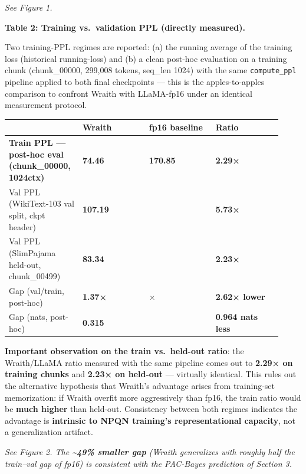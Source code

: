 \emph{See Figure 1.}

\textbf{Table 2: Training vs.~validation PPL (directly measured).}

Two training-PPL regimes are reported: (a) the running average of the
training loss (historical running-loss) and (b) a clean post-hoc
evaluation on a training chunk (chunk\_00000, 299,008 tokens, seq\_len
1024) with the same \texttt{compute\_ppl} pipeline applied to both final
checkpoints --- this is the apples-to-apples comparison to confront
Wraith with LLaMA-fp16 under an identical measurement protocol.

{\def\LTcaptype{none} %
{\footnotesize\setlength{\tabcolsep}{3pt}
\begin{longtable}[]{@{}>{\raggedright\arraybackslash}p{0.230\linewidth}>{\raggedright\arraybackslash}p{0.230\linewidth}>{\raggedright\arraybackslash}p{0.230\linewidth}>{\raggedright\arraybackslash}p{0.230\linewidth}@{}}
\toprule\noalign{}
 & Wraith & fp16 baseline & Ratio \\
\midrule\noalign{}
\endhead
\bottomrule\noalign{}
\endlastfoot
\textbf{Train PPL --- post-hoc eval (chunk\_00000, 1024ctx)} &
\textbf{74.46} & \textbf{170.85} & \textbf{2.29×} \\
Val PPL (WikiText-103 val split, ckpt header) & \textbf{107.19} & 613.96
& \textbf{5.73×} \\
Val PPL (SlimPajama held-out, chunk\_00499) & \textbf{83.34} & 185.84 &
\textbf{2.23×} \\
Gap (val/train, post-hoc) & \textbf{1.37×} & 3.59× & \textbf{2.62×
lower} \\
Gap (nats, post-hoc) & \textbf{0.315} & 1.279 & \textbf{0.964 nats
less} \\
\end{longtable}
}
}

\textbf{Important observation on the train vs.~held-out ratio}: the
Wraith/LLaMA ratio measured with the same pipeline comes out to
\textbf{2.29× on training chunks} and \textbf{2.23× on held-out} ---
virtually identical. This rules out the alternative hypothesis that
Wraith's advantage arises from training-set memorization: if Wraith
overfit more aggressively than fp16, the train ratio would be
\textbf{much higher} than held-out. Consistency between both regimes
indicates the advantage is \textbf{intrinsic to NPQN training's
representational capacity}, not a generalization artifact.

\emph{See Figure 2. The \textbf{\textasciitilde49\% smaller gap} (Wraith
generalizes with roughly half the train--val gap of fp16) is consistent
with the PAC-Bayes prediction of Section 3.}

